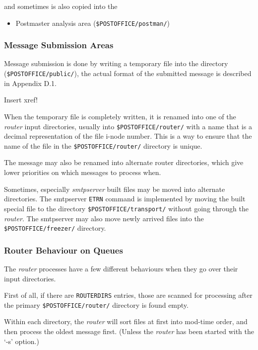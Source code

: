 and sometimes is also copied into the 
\begin{itemize}
\item Postmaster analysis area ({\tt \$POSTOFFICE/postman/})
\end{itemize}



\subsubsection{Message Submission Areas}



Message submission is done by writing a temporary file
into the directory ({\tt \$POSTOFFICE/public/}), the 
actual format of the submitted message is described in Appendix D.1.

Insert xref!

When the temporary file is completely written, it is renamed into one 
of the {\em router\/} input directories, usually into 
{\tt \$POSTOFFICE/router/} with a name that is a decimal representation
of the file i-node number. This is a way to ensure that the
name of the file in the {\tt \$POSTOFFICE/router/} directory is unique.

The message may also be renamed into alternate router directories, 
which give lower priorities on which messages to process when.

Sometimes, especially {\em smtpserver\/} built files may be moved
into alternate directories. The smtpserver {\tt ETRN}
command is implemented by moving the built special file to the 
directory {\tt \$POSTOFFICE/transport/} without going through the
{\em router\/}.  The smtpserver may also move newly arrived
files into the {\tt \$POSTOFFICE/freezer/} directory.




\subsubsection{Router Behaviour on Queues}



The {\em router\/} processes have a few different behaviours when
they go over their input directories.

First of all, if there are {\tt ROUTERDIRS} entries, those
are scanned for processing after the primary 
{\tt \$POSTOFFICE/router/} directory is found empty.

Within each directory, the {\em router\/} will sort files at first into 
mod-time order, and then process the oldest message first. (Unless the 
{\em router\/} has been started with the `-s' option.)

